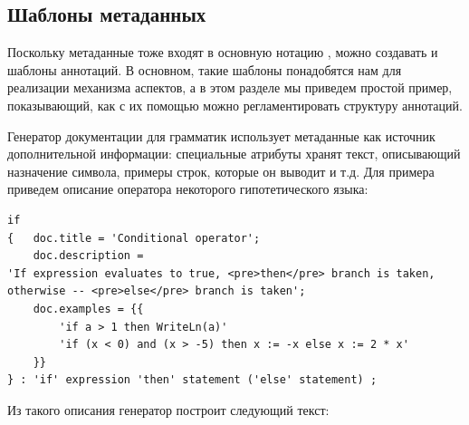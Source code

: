 \subsection{Шаблоны метаданных}

Поскольку метаданные тоже входят в основную нотацию , можно создавать и шаблоны аннотаций. В основном, такие шаблоны понадобятся нам для реализации механизма аспектов, а в этом разделе мы приведем простой пример, показывающий, как с их помощью можно регламентировать структуру аннотаций.

Генератор документации для грамматик использует метаданные как источник дополнительной информации: специальные атрибуты хранят текст, описывающий назначение символа, примеры строк, которые он выводит и т.д. Для примера приведем описание оператора  некоторого гипотетического языка:
\begin{lstlisting}[xleftmargin=0.3cm]
if
{	doc.title = 'Conditional operator';
	doc.description = 
'If expression evaluates to true, <pre>then</pre> branch is taken,
otherwise -- <pre>else</pre> branch is taken';
	doc.examples = {{
		'if a > 1 then WriteLn(a)'
		'if (x < 0) and (x > -5) then x := -x else x := 2 * x'
	}}
} : 'if' expression 'then' statement ('else' statement) ;
\end{lstlisting}

Из такого описания генератор построит следующий текст:
\begin{center}
\end{center}

